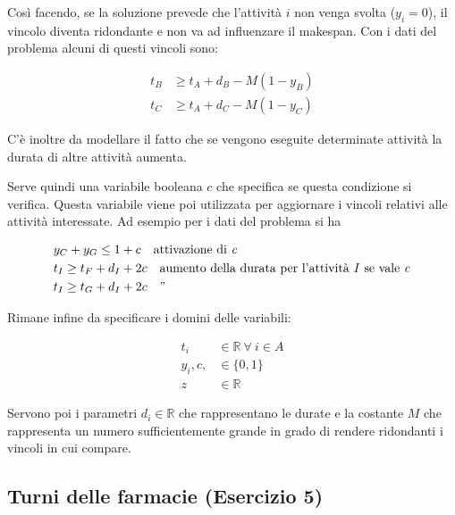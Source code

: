 \noindent Così facendo, se la soluzione prevede che l'attività $i$ non venga svolta ($y_i = 0$), il vincolo diventa ridondante e non va ad influenzare il makespan.
Con i dati del problema alcuni di questi vincoli sono:

\begin{align*}
	t_B &\geq t_{A} + d_B - M(1 - y_B) \\
	t_C &\geq t_{A} + d_C - M(1 - y_C)
\end{align*}

C'è inoltre da modellare il fatto che se vengono eseguite determinate attività la durata di altre attività aumenta.

Serve quindi una variabile booleana $c$ che specifica se questa condizione si verifica. Questa variabile viene poi utilizzata per aggiornare i vincoli relativi alle attività interessate. Ad esempio per i dati del problema si ha

\begin{align*}
	&y_C + y_G \leq 1 + c \quad \text{attivazione di \textit{c}} \\
	&t_I \geq t_F + d_I + 2c \quad \text{aumento della durata per l'attività \textit{I} se vale \textit{c}} \\ 
	&t_I \geq t_G + d_I + 2c \quad \text{''} \\
\end{align*}

\noindent Rimane infine da specificare i domini delle variabili:

\begin{align*}
	t_i &\in \mathbb{R} \: \forall \: i \in A \\
	y_i, c, &\in \{0,1\} \\
	z &\in \mathbb{R}
\end{align*}

\noindent Servono poi i parametri $d_i \in \mathbb{R}$ che rappresentano le durate e la costante $M$ che rappresenta un numero sufficientemente grande in grado di rendere ridondanti i vincoli in cui compare.

\subsection{Turni delle farmacie (Esercizio 5)}

